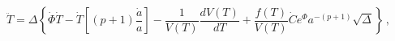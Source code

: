 \begin{equation}\label{Tachyon_motion}
{\ddot{T}} =  \Delta \left\{ {\dot{\Phi}}{\dot{T}} -
{\dot{T}}\left[ (p+1){\frac{\dot{a}}{a}} \right] -
{\frac{1}{V(T)}}{\frac{dV(T)}{dT}} + {\frac{f(T)}{V(T)}} {\dot{C}}
e^{\Phi} a^{-(p+1)}\sqrt{\Delta} \right\} \, ,
\end{equation}

